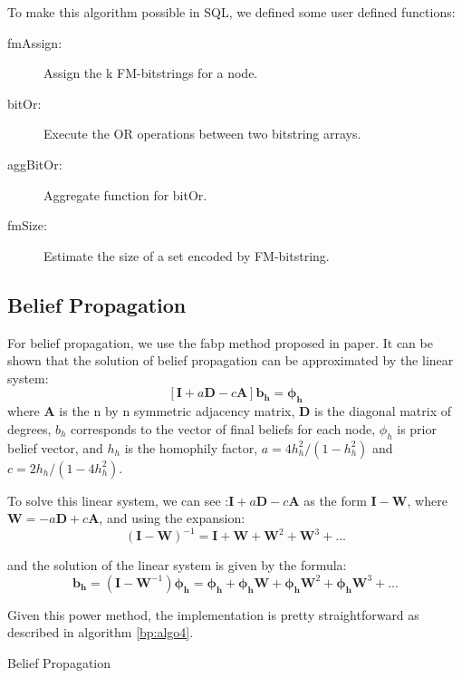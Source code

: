 To make this algorithm possible in SQL, we defined some user defined functions:
\begin{description}
  \item[fmAssign:] Assign the k FM-bitstrings for a node.
  \item[bitOr:] Execute the OR operations between two bitstring arrays.
  \item[aggBitOr:] Aggregate function for bitOr.
  \item[fmSize:] Estimate the size of a set encoded by FM-bitstring.
\end{description}

\subsection{Belief Propagation}
For belief propagation, we use the fabp method proposed in paper\cite{DBLP:conf/pkdd/KoutraKKCPF11}.
It can be shown that the solution of belief propagation can be approximated by the linear system:$$[\mathbf{I}	 + a\mathbf{D} - c\mathbf{A}]\mathbf{b_h} = \mathbf{\phi_h}$$ 
where $\mathbf{A}$ is the n by n symmetric adjacency matrix, $\mathbf{D}$ is the diagonal matrix of degrees, $b_h$ corresponds to the vector of final beliefs for each node, $\phi_h$ is prior belief vector, and $h_h$ is the homophily factor,  $a = 4h_h^2/(1 - h_h^2)$ and $c = 2h_h / (1-4h_h^2)$.

To solve this linear system, we can see :$\mathbf{I} + a\mathbf{D} - c\mathbf{A}$ as the form $\mathbf{I} - \mathbf{W}$, where $\mathbf{W} = -a\mathbf{D} + c\mathbf{A}$, and using the expansion:$$(\mathbf{I} - \mathbf{W})^{-1} = \mathbf{I} + \mathbf{W} + \mathbf{W}^2 + \mathbf{W}^3 + ...$$

and the solution of the linear system is given by the formula:
$$\mathbf{b_h} = (\mathbf{I} - \mathbf{W}^{-1})\mathbf{\phi_h} =\mathbf{\phi_h}  + \mathbf{\phi_h} \mathbf{W} + \mathbf{\phi_h} \mathbf{W}^2 + \mathbf{\phi_h} \mathbf{W}^3 + ...$$

Given this power method, the implementation is pretty straightforward as described in algorithm \ref{bp:algo4}.
\begin{algorithm}
\caption{Belief Propagation}
\begin{algorithmic}
\REPEAT
{}
\end{algorithmic}
\label{bp:algo4}
\end{algorithm}

